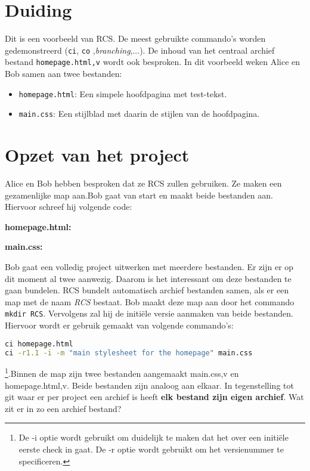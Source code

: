 \label{ch:voorbeeld-rcs} 
\setcounter{section}{0}
\section{Duiding}

Dit is een voorbeeld van RCS. De meest gebruikte commando's worden gedemonstreerd (\verb+ci+, \verb+co+ ,\textit{branching},...). De inhoud van het centraal archief bestand \verb+homepage.html,v+ wordt ook besproken. In dit voorbeeld weken Alice en Bob samen aan twee bestanden: 

\begin{itemize}
	\item \verb+homepage.html+: Een simpele hoofdpagina met test-tekst.
	\item \verb+main.css+: Een stijlblad met daarin de stijlen van de hoofdpagina.
\end{itemize}

\section{Opzet van het project}

Alice en Bob hebben besproken dat ze RCS zullen gebruiken. Ze maken een gezamenlijke map aan.Bob gaat van start en maakt beide bestanden aan. Hiervoor schreef hij volgende code:

\textbf{homepage.html:}

\textbf{main.css:}


Bob gaat een volledig project uitwerken met meerdere bestanden. Er zijn er op dit moment al twee aanwezig. Daarom is het interessant om deze bestanden te gaan bundelen. RCS bundelt automatisch archief bestanden samen, als er een map met de naam \textit{RCS} bestaat. Bob maakt deze map aan door het commando \verb+mkdir RCS+. Vervolgens zal hij de initiële versie aanmaken van beide bestanden. Hiervoor wordt er gebruik gemaakt van volgende commando's: 
\begin{lstlisting}[language=Bash]
ci homepage.html
ci -r1.1 -i -m "main stylesheet for the homepage" main.css
\end{lstlisting}
\footnote{De -i optie wordt gebruikt om duidelijk te maken dat het over een initiële eerste check in gaat. De -r optie wordt gebruikt om het versienummer te specificeren.}.Binnen de map zijn twee bestanden aangemaakt main.css,v en homepage.html,v. Beide bestanden zijn analoog aan elkaar. In tegenstelling tot git waar er per project een archief is heeft \textbf{elk bestand zijn eigen archief}. Wat zit er in zo een archief bestand?

